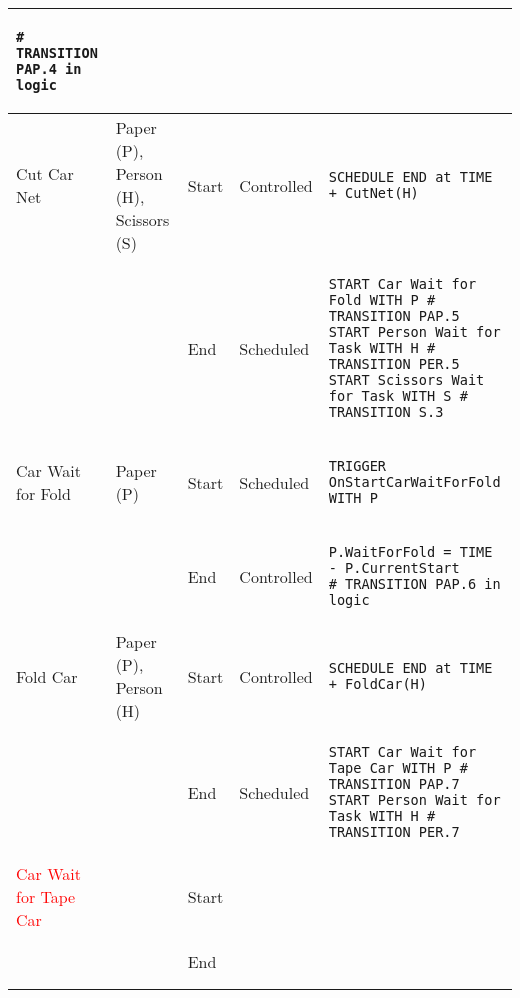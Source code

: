 \begin{longtable}{@{}>{\raggedright\arraybackslash}p{1.8cm}>{\raggedright\arraybackslash}p{2.1cm}>{\raggedright\arraybackslash}p{0.9cm}>{\raggedright\arraybackslash}p{2.2cm}>{\raggedright\arraybackslash}p{8.75cm}@{}}
\begin{lstlisting}[language=CMPseudo]
# TRANSITION PAP.4 in logic
\end{lstlisting}             \\ \midrule
  Cut Car Net               & Paper (P), Person (H), Scissors (S)     & Start & Controlled  & 
\begin{lstlisting}[language=CMPseudo]
SCHEDULE END at TIME + CutNet(H)
\end{lstlisting}             \\
  &                                                          & End   & Scheduled &
\begin{lstlisting}[language=CMPseudo]
START Car Wait for Fold WITH P # TRANSITION PAP.5
START Person Wait for Task WITH H # TRANSITION PER.5
START Scissors Wait for Task WITH S # TRANSITION S.3
\end{lstlisting}              \\ \midrule
  Car Wait for Fold         & Paper (P)                              & Start & Scheduled  & 
\begin{lstlisting}[language=CMPseudo]
TRIGGER OnStartCarWaitForFold WITH P
\end{lstlisting}             \\
  &                                                          & End   & Controlled & 
\begin{lstlisting}[language=CMPseudo]
P.WaitForFold = TIME - P.CurrentStart
# TRANSITION PAP.6 in logic
\end{lstlisting}             \\ \midrule
  Fold Car                  & Paper (P), Person (H)                  & Start & Controlled  & 
\begin{lstlisting}[language=CMPseudo]
SCHEDULE END at TIME + FoldCar(H)
\end{lstlisting}             \\
  &                                                          & End   & Scheduled & 
\begin{lstlisting}[language=CMPseudo]
START Car Wait for Tape Car WITH P # TRANSITION PAP.7
START Person Wait for Task WITH H # TRANSITION PER.7
\end{lstlisting}             \\ \midrule
  \textcolor{Red}{Car Wait for Tape Car}     &                                & Start &   & 
\begin{lstlisting}[language=CMPseudo]
 
\end{lstlisting}             \\
  &                                                          & End   &  & 
\begin{lstlisting}[language=CMPseudo]
 

\end{lstlisting}
\end{longtable}
